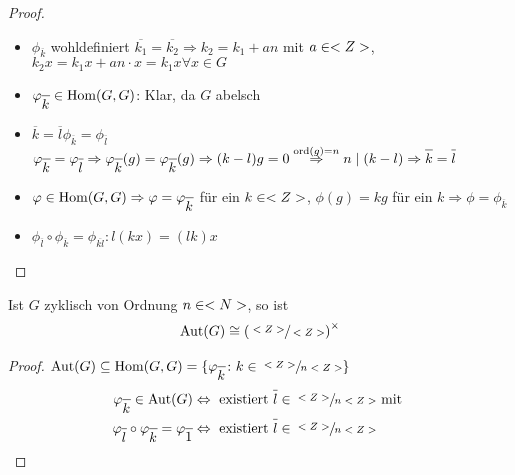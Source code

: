 \begin{proof}
	\begin{itemize}
		\item $\phi_{\overline{k}}$ wohldefiniert $\overline{k_1} = \overline{k_2} \Rightarrow k_2 = k_1 +an$ mit $a \in <Z>$, $k_2 x = k_1 x + a n \cdot x = k_1 x \forall x \in G$
		\item $\phi_{\overline{k}} \in \Hom(G,G)$: Klar, da $G$ abelsch
		\item $\overline{k}=\overline{l} \phi_{\overline{k}} = \phi_{\overline{l}}$\\
		$\phi_{\overline{k}} = \phi_{\overline{l}} \Rightarrow \phi_{\overline{k}}(g) = \phi_{\overline{k}}(g) \Rightarrow (k-l)g = 0 \overset{\ord(g) =n}{\Rightarrow} n \mid (k-l) \Rightarrow \overline{k} = \overline{l}$
		\item $\phi \in \Hom(G,G) \Rightarrow \phi = \phi_{\overline{k}}$ für ein $k \in <Z>$, $\phi(g) = kg$ für ein $k \Rightarrow \phi = \phi_{\overline{k}}$
		\item $\phi_{\overline{l}} \circ \phi_{\overline{k}} = \phi_{\overline{kl}} \colon l(kx) = (lk)x$
	\end{itemize}
\end{proof}

\begin{proposition}
	Ist $G$ zyklisch von Ordnung $n \in <N>$, so ist
	\begin{align}
		\operatorname{Aut}(G) \cong \left( \sfrac{<Z>}{<Z>}\right)^{\times}\notag
	\end{align}
\end{proposition}

\begin{proof}
	$\Aut(G) \subseteq \Hom(G,G) = \{ \phi_{\overline{k}} \colon k \in \qraum{\whole}{n\whole} \}$\\
	\begin{align}
		\phi_{\overline{k}} \in \Aut(G) &\Leftrightarrow \text{ existiert } \overline{l} \in \qraum{\whole}{n\whole} \text{ mit }\notag\\ \phi_{\overline{l}} \circ \phi_{\overline{k}} = \phi_{\overline{1}} &\Leftrightarrow \text{ existiert } \overline{l} \in \qraum{\whole}{n\whole}
	\end{align}
\end{proof}